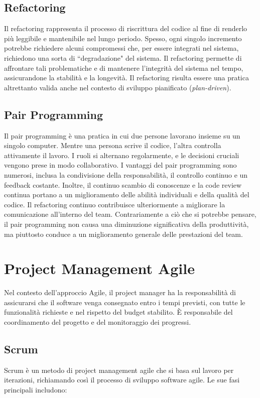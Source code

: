 \subsection{Refactoring}
Il refactoring rappresenta il processo di riscrittura del codice al fine di renderlo più leggibile e mantenibile nel lungo periodo.
Spesso, ogni singolo incremento potrebbe richiedere alcuni compromessi che, per essere integrati nel sistema, richiedono una sorta di
``degradazione" del sistema. Il refactoring permette di affrontare tali problematiche e di mantenere l'integrità del sistema nel tempo,
assicurandone la stabilità e la longevità. Il refactoring risulta essere una pratica altrettanto valida anche nel contesto di sviluppo
pianificato (\textit{plan-driven}).

\subsection{Pair Programming}
Il pair programming è una pratica in cui due persone lavorano insieme su un singolo computer. Mentre una persona scrive il codice,
l'altra controlla attivamente il lavoro. I ruoli si alternano regolarmente, e le decisioni cruciali vengono prese in modo collaborativo.
I vantaggi del pair programming sono numerosi, inclusa la condivisione della responsabilità, il controllo continuo e un feedback costante.
Inoltre, il continuo scambio di conoscenze e la code review continua portano a un miglioramento delle abilità individuali e della qualità
del codice. Il refactoring continuo contribuisce ulteriormente a migliorare la comunicazione all'interno del team. Contrariamente a ciò
che si potrebbe pensare, il pair programming non causa una diminuzione significativa della produttività, ma piuttosto conduce a un miglioramento
generale delle prestazioni del team.

\section{Project Management Agile}
Nel contesto dell'approccio Agile, il project manager ha la responsabilità di assicurarsi che il software venga consegnato entro i tempi
previsti, con tutte le funzionalità richieste e nel rispetto del budget stabilito. È responsabile del coordinamento del progetto e del
monitoraggio dei progressi.

\subsection{Scrum}
Scrum è un metodo di project management agile che si basa sul lavoro per iterazioni, richiamando così il processo di sviluppo software agile.
Le sue fasi principali includono:

